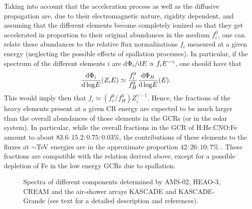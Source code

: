\documentclass[twoside,12pt]{article}
\newcommand{\be}{\begin{equation}}
\newcommand{\ee}{\end{equation}}
\begin{document}
Taking into account that the acceleration process as well as the diffusive propagation are, due to their electromagnetic nature, rigidity dependent, and assuming that the different elements become completely ionized so that they get accelerated in proportion to their original abundances in the medium $f_i^0$, one can relate these abundances to the relative flux normalizations $f_i$ measured at a given energy (neglecting the possible effects of spallation processes). In particular, if the spectrum of the different elements $i$ are d$\Phi_i/{\rm d}E\propto f_i E^{-\gamma}$,  one should have that 
\be 
\frac{{\rm d}\Phi_i}{{\rm d\,log}E}(Z_iE)\simeq \frac{f^0_i}{f^0_H}\frac{{\rm d}\Phi_H}{{\rm d\,log}E}(E).
\ee
This would imply then that $f_i\simeq (f^0_i/f^0_H)Z_i^{\gamma-1}$. Hence, the fractions of the heavy elements present at a given CR energy are expected to be  much larger than the overall abundances of those elements in the GCRs (or in the solar system). 
In particular, while the overall fractions in the GCR of H:He:CNO:Fe amount to about $83.6:15.2:0.75:0.03$\%, the contributions of these elements to the fluxes at $\sim$TeV energies are in the approximate proportion $42:26:10:7$\% \cite{wi98}. These fractions are compatible with the relation derived above, except for a possible depletion of Fe in the low energy GCRs due to spallation. 

\begin{figure}[tb]
\begin{center}
\begin{minipage}[t]{8 cm}
\centerline{}
\end{minipage}
\caption{Spectra of different components determined by AMS-02, HEAO-3, CREAM and the air-shower arrays KASCADE and KASCADE-Grande (see text for a detailed description and references).\label{spectrumle}}
\end{center}
\end{figure}
\end{document}
